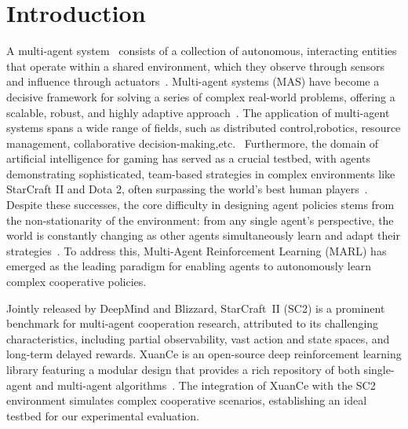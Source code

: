 \section{Introduction}\label{sec:intro}

A multi-agent system~\cite{weissMultiagentSystems2016} consists of a collection of autonomous, interacting entities that operate within a shared environment, which they observe through sensors and influence through actuators~\cite{busoniuComprehensiveSurveyMultiagent2008a}.
Multi-agent systems (MAS) have become a decisive framework for solving a series of complex real-world problems, offering a scalable, robust, and highly adaptive approach~\cite{messingIntroductionMultiAgentSystems2002}.
The application of multi-agent systems spans a wide range of fields, such as distributed control,robotics, resource management, collaborative decision-making,etc.~\cite{critesElevatorGroupControl1998,riedmillerReinforcementLearningCooperating2001,tesauroPricingAgentEconomies2002,steingroverReinforcementLearningTraffic2005}
Furthermore, the domain of artificial intelligence for gaming has served as a crucial testbed, with agents demonstrating sophisticated, team-based strategies in complex environments like StarCraft II and Dota 2, often surpassing the world's best human players~\cite{vinyalsGrandmasterLevelStarCraft2019,openaiDota2Large2019}.
Despite these successes, the core difficulty in designing agent policies stems from the non-stationarity of the environment: from any single agent's perspective, the world is constantly changing as other agents simultaneously learn and adapt their strategies~\cite{stoneMultiagentSystemsSurvey2000}.
To address this, Multi-Agent Reinforcement Learning (MARL) has emerged as the leading paradigm for enabling agents to autonomously learn complex cooperative policies.

Jointly released by DeepMind and Blizzard, StarCraft~II (SC2) is a prominent benchmark 
for multi-agent cooperation research, attributed to its challenging characteristics, 
including partial observability, vast action and state spaces, and long-term delayed rewards.
XuanCe is an open-source deep reinforcement learning library featuring a modular design 
that provides a rich repository of both single-agent and multi-agent algorithms~\cite{liuXuanCeComprehensiveUnified2023}. 
The integration of XuanCe with the SC2 environment simulates complex cooperative scenarios, 
establishing an ideal testbed for our experimental evaluation.

